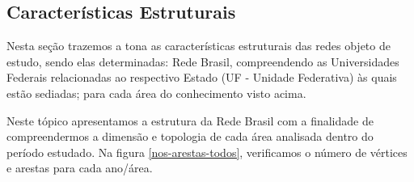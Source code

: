 \subsection{\textbf{Características Estruturais}}

Nesta seção trazemos a tona as características estruturais das redes objeto de estudo, sendo elas determinadas: Rede Brasil, compreendendo as Universidades Federais relacionadas ao respectivo Estado (UF - Unidade Federativa) às quais estão sediadas; para cada área do conhecimento visto acima.

Neste tópico apresentamos a estrutura da Rede Brasil com a finalidade de compreendermos a dimensão e topologia de cada área analisada dentro do período estudado. Na figura \ref{nos-arestas-todos}, verificamos o número de vértices e arestas para cada ano/área.


